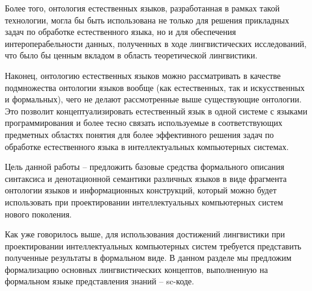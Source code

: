 Более того, онтология естественных языков, разработанная в рамках такой технологии, могла бы быть использована не только для решения прикладных задач по обработке естественного языка, но и для обеспечения интероперабельности данных, полученных в ходе лингвистических исследований, что было бы ценным вкладом в область теоретической лингвистики.

Наконец, онтологию естественных языков можно рассматривать в качестве подмножества онтологии языков вообще (как естественных, так и искусственных и формальных), чего не делают рассмотренные выше существующие онтологии. Это позволит концептуализировать естественный язык в одной системе с языками программирования и более тесно связать используемые в соответствующих предметных областях понятия для более эффективного решения задач по обработке естественного языка в интеллектуальных компьютерных системах.

Цель данной работы -- предложить базовые средства формального описания синтаксиса и денотационной семантики различных языков в виде фрагмента онтологии языков и информационных конструкций, который можно будет использовать при проектировании интеллектуальных компьютерных систем нового поколения.

Как уже говорилось выше, для использования достижений лингвистики при проектировании интеллектуальных компьютерных систем требуется представить полученные результаты в формальном виде. В данном разделе мы предложим формализацию основных лингвистических концептов, выполненную на формальном языке представления знаний -- sc-коде.

